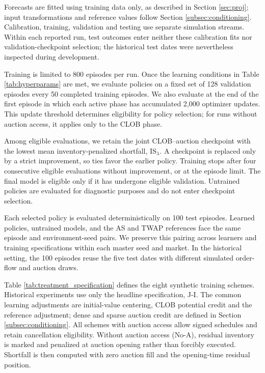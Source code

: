 \documentclass[11pt]{article}
\begin{document}
Forecasts are fitted using training data only, as described in Section \ref{sec:proj}; input transformations and reference values follow Section \ref{subsec:conditioning}. Calibration, training, validation and testing use separate simulation streams. Within each reported run, test outcomes enter neither these calibration fits nor validation-checkpoint selection; the historical test dates were nevertheless inspected during development.

Training is limited to 800 episodes per run. Once the learning conditions in Table \ref{tab:hyperparams} are met, we evaluate policies on a fixed set of 128 validation episodes every 50 completed training episodes. We also evaluate at the end of the first episode in which each active phase has accumulated 2,000 optimizer updates. This update threshold determines eligibility for policy selection; for runs without auction access, it applies only to the CLOB phase.\vspace{0.5em}

Among eligible evaluations, we retain the joint CLOB--auction checkpoint with the lowest mean inventory-penalized shortfall, $\mathrm{IS}_\lambda$. A checkpoint is replaced only by a strict improvement, so ties favor the earlier policy. Training stops after four consecutive eligible evaluations without improvement, or at the episode limit. The final model is eligible only if it has undergone eligible validation. Untrained policies are evaluated for diagnostic purposes and do not enter checkpoint selection.\vspace{0.5em}

Each selected policy is evaluated deterministically on 100 test episodes. Learned policies, untrained models, and the AS and TWAP references face the same episode and environment-seed pairs. We preserve this pairing across learners and training specifications within each master seed and market. In the historical setting, the 100 episodes reuse the five test dates with different simulated order-flow and auction draws.\vspace{0.5em}

Table \ref{tab:treatment_specification} defines the eight synthetic training schemes. Historical experiments use only the headline specification, J-I. The common learning adjustments are initial-value centering, CLOB potential credit and the reference adjustment; dense and sparse auction credit are defined in Section \ref{subsec:conditioning}. All schemes with auction access allow signed schedules and retain cancellation eligibility. Without auction access (No-A), residual inventory is marked and penalized at auction opening rather than forcibly executed. Shortfall is then computed with zero auction fill and the opening-time residual position.\vspace{0.5em}
\end{document}
